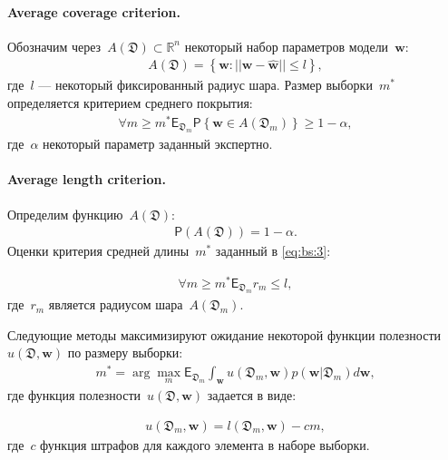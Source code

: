 \paragraph{Average coverage criterion.}
Обозначим через~$A\left(\mathfrak{D}\right) \subset \mathbb{R}^n$ некоторый набор параметров модели~$\textbf{w}$:
\[
\label{eq:bs:2}
\begin{aligned}
	A\left(\mathfrak{D}\right) = \left\{\textbf{w}:||\textbf{w} - \hat{\textbf{w}}||\leq l\right\},
\end{aligned}
\]
где~$l$ --- некоторый фиксированный радиус шара.
Размер выборки~$m^*$ определяется критерием среднего покрытия:
\[
\label{eq:bs:3}
\begin{aligned}
	\forall m \geq m^*    \mathsf{E}_{\mathfrak{D}_m}\mathsf{P}\left\{\textbf{w} \in A\left(\mathfrak{D}_m\right)\right\} \geq 1-\alpha,
\end{aligned}
\]
где~$\alpha$ некоторый параметр заданный экспертно.
	
\paragraph{Average length criterion.}
Определим функцию~$A\left(\mathfrak{D}\right)$:
\[
\label{eq:bs:4}
\begin{aligned}
	\mathsf{P}\left(A\left(\mathfrak{D}\right)\right) =  1- \alpha.
\end{aligned}
\]
Оценки критерия средней длины~$m^*$ заданный в \eqref{eq:bs:3}:
	
\[
\label{eq:bs:5}
\begin{aligned}
	\forall m \geq m^*    \mathsf{E}_{\mathfrak{D}_m}r_m\leq l,
\end{aligned}
\]
где~$r_m$ является радиусом шара~$A\left(\mathfrak{D}_{m}\right)$.

Следующие методы максимизируют ожидание некоторой функции полезности~$u\left(\mathfrak{D}, \textbf{w}\right)$ по размеру выборки:
\[
\label{eq:bs:6}
\begin{aligned}
	m^* = \arg\max_{m} \mathsf{E}_{\mathfrak{D}_m}\int_{\textbf{w}}u\left(\mathfrak{D}_m, \textbf{w}\right)p(\textbf{w}|\mathfrak{D}_m)d\textbf{w},
\end{aligned}
\]
где функция полезности~$u\left(\mathfrak{D}, \textbf{w}\right)$ задается в виде:

\[
\label{eq:bs:7}
\begin{aligned}
	u\left(\mathfrak{D}_m, \textbf{w}\right) = l\left(\mathfrak{D}_m, \textbf{w}\right) - cm,
\end{aligned}
\]
 где~$c$ функция штрафов для каждого элемента в наборе выборки.
	 
